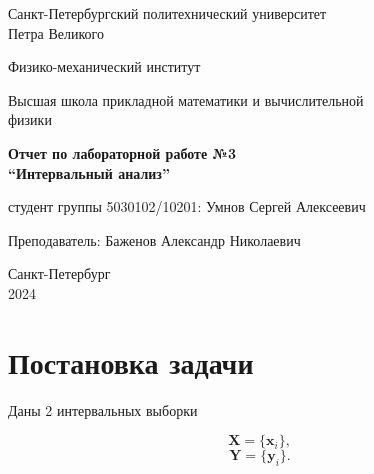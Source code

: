 \documentclass{article}
\begin{document}
  \begin{titlepage}
    \begin{center}
      Санкт-Петербургский политехнический университет \\Петра Великого
    \end{center}

    \begin{center}
      Физико-механический институт
    \end{center}

    \begin{center}
      Высшая школа прикладной математики и вычислительной\\ физики
    \end{center}

    \vspace{8em}

    \begin{center}
      \textbf{Отчет по лабораторной работе №3}\\
      \textbf{“Интервальный анализ”}
    \end{center}

    \vspace{\fill}

    \begin{flushright}
       студент группы 5030102/10201:
      \hfill
      Умнов Сергей Алексеевич \\
    \end{flushright}
    Преподаватель: \hfill Баженов Александр Николаевич

    \vspace{12em}

    \begin{center}
      Санкт-Петербург\\
      2024
    \end{center}
  \end{titlepage}

  \tableofcontents

  \newpage

  \section{Постановка задачи}

  Даны 2 интервальных выборки

  \begin{equation}
    \mathbf{X} = \{ \mathbf{x}_i \},
  \end{equation}
  \begin{equation}
    \mathbf{Y} = \{ \mathbf{y}_i \}.
  \end{equation}
\end{document}

